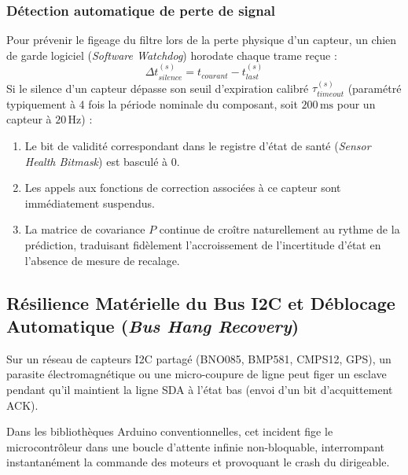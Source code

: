 \documentclass[../Implementation.tex]{subfiles}
\begin{document}
\subsubsection{Détection automatique de perte de signal}
Pour prévenir le figeage du filtre lors de la perte physique d'un capteur, un chien de garde logiciel (\textit{Software Watchdog}) horodate chaque trame reçue :
\begin{equation}
    \Delta t_{silence}^{(s)} = t_{courant} - t_{last}^{(s)}
\end{equation}
Si le silence d'un capteur dépasse son seuil d'expiration calibré $\tau_{timeout}^{(s)}$ (paramétré typiquement à 4 fois la période nominale du composant, soit $200\,\text{ms}$ pour un capteur à $20\,\text{Hz}$) :
\begin{enumerate}
    \item Le bit de validité correspondant dans le registre d'état de santé (\textit{Sensor Health Bitmask}) est basculé à 0.
    \item Les appels aux fonctions de correction associées à ce capteur sont immédiatement suspendus.
    \item La matrice de covariance $P$ continue de croître naturellement au rythme de la prédiction, traduisant fidèlement l'accroissement de l'incertitude d'état en l'absence de mesure de recalage.
\end{enumerate}

\subsection{Résilience Matérielle du Bus I2C et Déblocage Automatique (\textit{Bus Hang Recovery})}

Sur un réseau de capteurs I2C partagé (BNO085, BMP581, CMPS12, GPS), un parasite électromagnétique ou une micro-coupure de ligne peut figer un esclave pendant qu'il maintient la ligne SDA à l'état bas (envoi d'un bit d'acquittement ACK). 

Dans les bibliothèques Arduino conventionnelles, cet incident fige le microcontrôleur dans une boucle d'attente infinie non-bloquable, interrompant instantanément la commande des moteurs et provoquant le crash du dirigeable.
\end{document}
